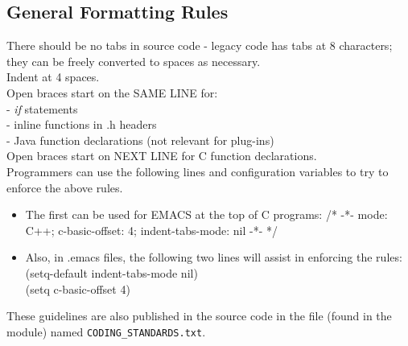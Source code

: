 \documentclass[11pt,fleqn]{article} %
\begin{document}
\subsection{General Formatting Rules}
There should be no tabs in source code - legacy code has tabs at 8 characters; they can be freely converted to spaces as necessary.\\

Indent at 4 spaces.\\ 

Open braces start on the SAME LINE for: \\
  - \textit{if} statements \\
  - inline functions in .h headers \\
  - Java function declarations (not relevant for plug-ins)\\

Open braces start on NEXT LINE for C function declarations.\\

Programmers can use the following lines and configuration variables to try to enforce the above rules. 
\begin{itemize}
\item The first can be used for EMACS at the top of C programs:  /* -*- mode: C++; c-basic-offset: 4; indent-tabs-mode: nil -*- */ 
\item Also, in .emacs files, the following two lines will assist in enforcing the rules: \\
  (setq-default indent-tabs-mode nil) \\
  (setq c-basic-offset 4) \\
\end{itemize}
These guidelines are also published in the \bulk source code in the file (found in the \beapi module) named \texttt{CODING\_STANDARDS.txt}\cite{bulkguidelines}. 
\end{document}
